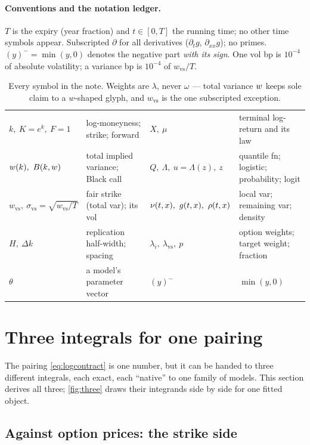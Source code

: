 \documentclass[11pt]{article}
\newcommand{\wvs}{w_{\mathrm{vs}}}
\newcommand{\svs}{\sigma_{\mathrm{vs}}}
\newcommand{\lam}{\lambda}
\newcommand{\Lo}{\Lambda}
\begin{document}
\paragraph{Conventions and the notation ledger.}
$T$ is the expiry (year fraction) and $t\in[0,T]$ the running time; no
other time symbols appear.  Subscripted $\partial$ for all derivatives
($\partial_t g$, $\partial_{xx}g$); no primes.  $(y)^-=\min(y,0)$ denotes
the negative part \emph{with its sign}.  One vol bp is $10^{-4}$ of
absolute volatility; a variance bp is $10^{-4}$ of $\wvs/T$.

\begin{table}[H]
\centering\footnotesize
\setlength{\tabcolsep}{3pt}
\begin{tabular}{@{}llll@{}}
\toprule
$k,\ K=e^k,\ F=1$ & log-moneyness; strike; forward &
$X,\ \mu$ & terminal log-return and its law\\[2pt]
$\tvar(k),\ \Black(k,\tvar)$ & total implied variance; Black call &
$Q,\ \Lo,\ u=\Lo(z),\ z$ & quantile fn; logistic; probability; logit\\[2pt]
$\wvs,\ \svs=\sqrt{\wvs/T}$ & fair strike (total var); its vol &
$\locvar(t,x),\ g(t,x),\ \rho(t,x)$ & local var; remaining var; density\\[2pt]
$H,\ \Delta k$ & replication half-width; spacing &
$\lam_i,\ \lam_{\mathrm{vs}},\ p$ & option weights; target weight; fraction\\[2pt]
$\theta$ & a model's parameter vector &
$(y)^-$ & $\min(y,0)$\\
\bottomrule
\end{tabular}
\caption{Every symbol in the note.  Weights are $\lam$, never $\omega$
--- total variance $w$ keeps sole claim to a $w$-shaped glyph, and
$\wvs$ is the one subscripted exception.}
\label{tab:ledger}
\end{table}

\section{Three integrals for one pairing}
\label{sec:three}

The pairing \eqref{eq:logcontract} is one number, but it can be handed to
three different integrals, each exact, each ``native'' to one family of
models.  This section derives all three; \cref{fig:three} draws their
integrands side by side for one fitted object.

\subsection{Against option prices: the strike side}
\end{document}
